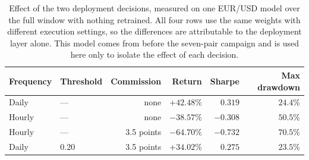 \begin{table}[htb!]
\centering
\footnotesize
\caption{Effect of the two deployment decisions, measured on one EUR/USD model over the full window with nothing retrained. All four rows use the same weights with different execution settings, so the differences are attributable to the deployment layer alone. This model comes from before the seven-pair campaign and is used here only to isolate the effect of each decision.}
\label{Tables:Deployment}
\begin{tabular}{@{}llrrrr@{}}
\toprule
\textbf{Frequency} & \textbf{Threshold} & \textbf{Commission} & \textbf{Return} & \textbf{Sharpe} & \textbf{Max drawdown} \\
\midrule
Daily & --- & none & $+42.48\%$ & $0.319$ & $24.4\%$ \\
Hourly & --- & none & $-38.57\%$ & $-0.308$ & $50.5\%$ \\
Hourly & --- & 3.5 points & $-64.70\%$ & $-0.732$ & $70.5\%$ \\
Daily & $0.20$ & 3.5 points & $+34.02\%$ & $0.275$ & $23.5\%$ \\
\bottomrule
\end{tabular}
\end{table}